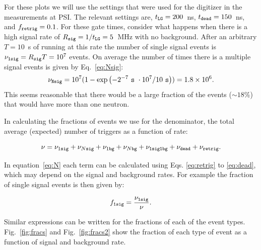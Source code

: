\documentclass[letter,twocolumn,preprint,3p]{elsarticle}
\begin{document}
For these plots we will use the settings that were used for the
digitizer in the measurements at PSI.  The relevant settings are,
$t_{\tt LG}=200$~ns, $t_{\tt dead}=150$~ns, and $f_{\tt retrig}=0.1$.
For these gate times, consider what happens when there is a high
signal rate of $R_{\tt sig} = 1/t_{\tt LG} = 5$~MHz with no
background.  After an arbitrary $T=10$~s of running at this rate the
number of single signal events is $\nu_{\tt 1 sig} = R_{\tt sig} T =
10^7$ events.  On average the number of times there is a multiple
signal events is given by Eq.~\ref{eq:Nsig}:
\begin{equation}
\nu_{\tt N sig} = 10^7 ( 1 - \exp{ \left( -2^{-7}\ {\tt s}\ \cdot 10^7  / 10\ {\tt s} \right) } ) = 1.8\times10^6. 
\end{equation}
This seems reasonable that there would be a large fraction of the
events ($\sim 18$\%) that would have more than one neutron.

In calculating the fractions of events we use for the denominator, the
total average (expected) number of triggers as a function of rate:

\begin{equation}\label{eq:N}
\nu = \nu_{1\tt sig} + \nu_{N\tt sig} + \nu_{1\tt bg} + \nu_{N\tt bg} + \nu_{\tt 1 sig 1 bg} + \nu_{\tt dead} + \nu_{\tt retrig}.
\end{equation}

In equation~\ref{eq:N} each term can be calculated using
Eqs. \ref{eq:retrig} to \ref{eq:dead}, which may depend on the signal
and background rates.  For example the fraction of single signal
events is then given by:

\begin{equation}
f_{\tt 1 sig } = \frac{ \nu_{\tt 1 sig} }{ \nu }.
\end{equation}

Similar expressions can be written for the fractions of each of the
event types.  Fig.~\ref{fig:fracs} and Fig.~\ref{fig:fracs2} show the
fraction of each type of event as a function of signal and background
rate.
\end{document}
